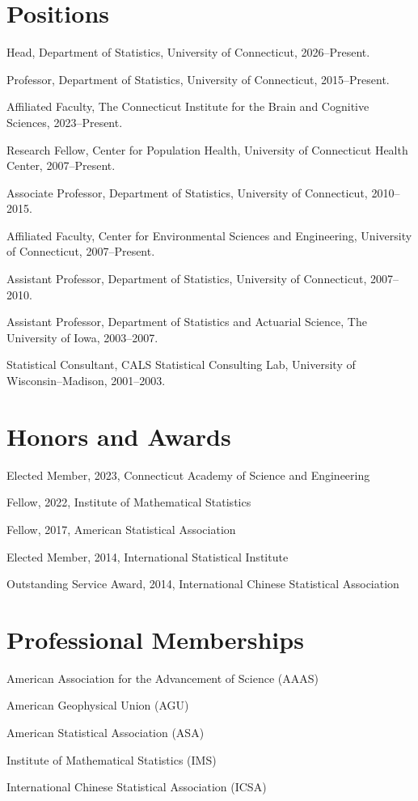 \documentclass[Statistics]{vita}
\begin{document}
\begin{vita}
  \section{Positions}
  \begin{description}
  \item Head, Department of Statistics, University of Connecticut, 2026--Present.
  \item Professor, Department of Statistics, University of Connecticut, 2015--Present.
  \item Affiliated Faculty, The Connecticut Institute for the Brain and Cognitive Sciences, 2023--Present.
  \item Research Fellow, Center for Population Health, University of Connecticut Health Center, 2007--Present.
  \item Associate Professor, Department of Statistics, University of Connecticut, 2010--2015.
  \item Affiliated Faculty, Center for Environmental Sciences and Engineering, University of Connecticut, 2007--Present.
  \item Assistant Professor, Department of Statistics, University of Connecticut, 2007--2010.
  \item Assistant Professor, Department of Statistics and Actuarial Science, The University of Iowa, 2003--2007.
  \item Statistical Consultant, CALS Statistical Consulting Lab, University of Wisconsin--Madison,  2001--2003. %
  \end{description}
  \section{Honors and Awards}
  \begin{description}
  \item Elected Member, 2023, Connecticut Academy of Science and Engineering
  \item Fellow, 2022, Institute of Mathematical Statistics
  \item Fellow, 2017, American Statistical Association
  \item Elected Member, 2014, International Statistical Institute
  \item Outstanding Service Award, 2014, International Chinese Statistical Association
  \end{description}
  \section{Professional Memberships}
  \begin{description}
  \item American Association for the Advancement of Science (AAAS)
  \item American Geophysical Union (AGU) 
  \item American Statistical Association (ASA)
  \item Institute of Mathematical Statistics (IMS)
  \item International Chinese Statistical Association (ICSA) 
  \end{description}

\end{vita}
\end{document}
